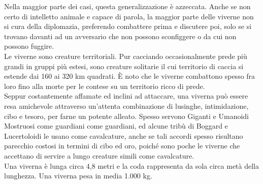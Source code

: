 \begin{multicols}{2}
Nella maggior parte dei casi, questa generalizzazione è azzeccata. Anche se non certo di intelletto animale e capace di parola, la maggior parte delle viverne non si cura della diplomazia, preferendo combattere prima e discutere poi, solo se si trovano davanti ad un avversario che non possono sconfiggere o da cui non possono fuggire.\\

Le viverne sono creature territoriali. Pur cacciando occasionalmente prede più grandi in gruppi più estesi, sono creature solitarie il cui territorio di caccia si estende dai 160 ai 320 km quadrati. È noto che le viverne combattono spesso fra loro fino alla morte per le contese su un territorio ricco di prede.\\


Seppur costantemente affamate ed inclini ad attaccare, una viverna può essere resa amichevole attraverso un’attenta combinazione di lusinghe, intimidazione, cibo e tesoro, per farne un potente alleato. Spesso servono Giganti e Umanoidi Mostruosi come guardiani come guardiani, ed alcune tribù di Boggard e Lucertoloidi le usano come cavalcature, anche se tali accordi spesso risultano parecchio costosi in termini di cibo ed oro, poiché sono poche le viverne che accettano di servire a lungo creature simili come cavalcature.\\

Una viverna è lunga circa 4,8 metri e la coda rappresenta da sola circa metà della lunghezza. Una viverna pesa in media 1.000 kg.\\


\end{multicols}
